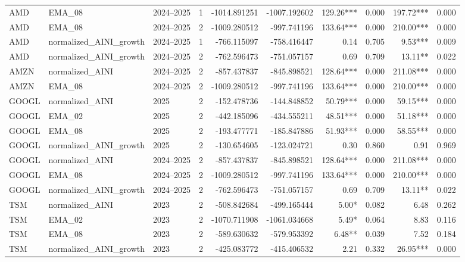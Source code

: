 \begin{table}[H]
{\begin{tabular}{l l l r r r r r r r}
AMD & EMA\_08 & 2024--2025 & 1 & -1014.891251 & -1007.192602 & 129.26*** & 0.000 & 197.72*** & 0.000 \\
AMD & EMA\_08 & 2024--2025 & 2 & -1009.280512 & -997.741196 & 133.64*** & 0.000 & 210.00*** & 0.000 \\
AMD & normalized\_AINI\_growth & 2024--2025 & 1 & -766.115097 & -758.416447 & 0.14 & 0.705 & 9.53*** & 0.009 \\
AMD & normalized\_AINI\_growth & 2024--2025 & 2 & -762.596473 & -751.057157 & 0.69 & 0.709 & 13.11** & 0.022 \\
AMZN & normalized\_AINI & 2024--2025 & 2 & -857.437837 & -845.898521 & 128.64*** & 0.000 & 211.08*** & 0.000 \\
AMZN & EMA\_08 & 2024--2025 & 2 & -1009.280512 & -997.741196 & 133.64*** & 0.000 & 210.00*** & 0.000 \\
GOOGL & normalized\_AINI & 2025 & 2 & -152.478736 & -144.848852 & 50.79*** & 0.000 & 59.15*** & 0.000 \\
GOOGL & EMA\_02 & 2025 & 2 & -442.185096 & -434.555211 & 48.51*** & 0.000 & 51.18*** & 0.000 \\
GOOGL & EMA\_08 & 2025 & 2 & -193.477771 & -185.847886 & 51.93*** & 0.000 & 58.55*** & 0.000 \\
GOOGL & normalized\_AINI\_growth & 2025 & 2 & -130.654605 & -123.024721 & 0.30 & 0.860 & 0.91 & 0.969 \\
GOOGL & normalized\_AINI & 2024--2025 & 2 & -857.437837 & -845.898521 & 128.64*** & 0.000 & 211.08*** & 0.000 \\
GOOGL & EMA\_08 & 2024--2025 & 2 & -1009.280512 & -997.741196 & 133.64*** & 0.000 & 210.00*** & 0.000 \\
GOOGL & normalized\_AINI\_growth & 2024--2025 & 2 & -762.596473 & -751.057157 & 0.69 & 0.709 & 13.11** & 0.022 \\
TSM & normalized\_AINI & 2023 & 2 & -508.842684 & -499.165444 & 5.00* & 0.082 & 6.48 & 0.262 \\
TSM & EMA\_02 & 2023 & 2 & -1070.711908 & -1061.034668 & 5.49* & 0.064 & 8.83 & 0.116 \\
TSM & EMA\_08 & 2023 & 2 & -589.630632 & -579.953392 & 6.48** & 0.039 & 7.52 & 0.184 \\
TSM & normalized\_AINI\_growth & 2023 & 2 & -425.083772 & -415.406532 & 2.21 & 0.332 & 26.95*** & 0.000 \\
\bottomrule
\end{tabular}

}
\end{table}